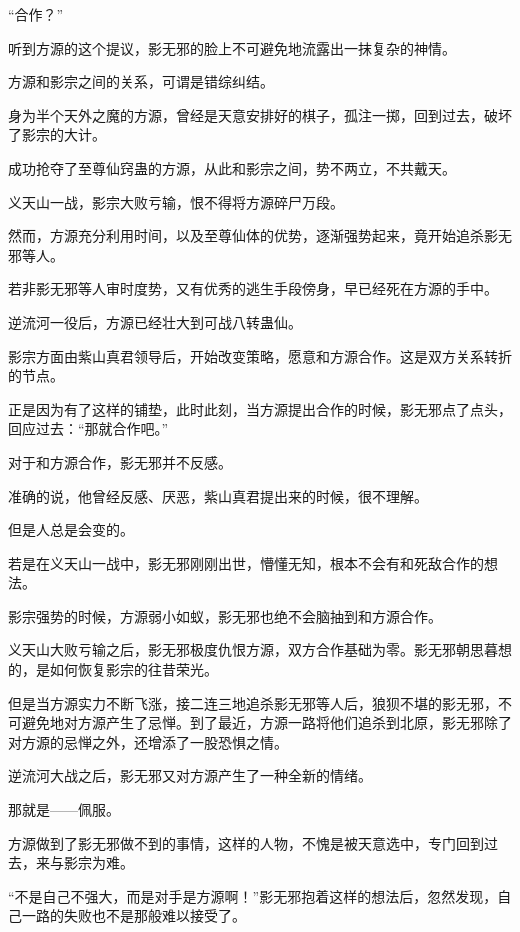 
\begin{this_body}



“合作？”

听到方源的这个提议，影无邪的脸上不可避免地流露出一抹复杂的神情。

方源和影宗之间的关系，可谓是错综纠结。

身为半个天外之魔的方源，曾经是天意安排好的棋子，孤注一掷，回到过去，破坏了影宗的大计。

成功抢夺了至尊仙窍蛊的方源，从此和影宗之间，势不两立，不共戴天。

义天山一战，影宗大败亏输，恨不得将方源碎尸万段。

然而，方源充分利用时间，以及至尊仙体的优势，逐渐强势起来，竟开始追杀影无邪等人。

若非影无邪等人审时度势，又有优秀的逃生手段傍身，早已经死在方源的手中。

逆流河一役后，方源已经壮大到可战八转蛊仙。

影宗方面由紫山真君领导后，开始改变策略，愿意和方源合作。这是双方关系转折的节点。

正是因为有了这样的铺垫，此时此刻，当方源提出合作的时候，影无邪点了点头，回应过去：“那就合作吧。”

对于和方源合作，影无邪并不反感。

准确的说，他曾经反感、厌恶，紫山真君提出来的时候，很不理解。

但是人总是会变的。

若是在义天山一战中，影无邪刚刚出世，懵懂无知，根本不会有和死敌合作的想法。

影宗强势的时候，方源弱小如蚁，影无邪也绝不会脑抽到和方源合作。

义天山大败亏输之后，影无邪极度仇恨方源，双方合作基础为零。影无邪朝思暮想的，是如何恢复影宗的往昔荣光。

但是当方源实力不断飞涨，接二连三地追杀影无邪等人后，狼狈不堪的影无邪，不可避免地对方源产生了忌惮。到了最近，方源一路将他们追杀到北原，影无邪除了对方源的忌惮之外，还增添了一股恐惧之情。

逆流河大战之后，影无邪又对方源产生了一种全新的情绪。

那就是——佩服。

方源做到了影无邪做不到的事情，这样的人物，不愧是被天意选中，专门回到过去，来与影宗为难。

“不是自己不强大，而是对手是方源啊！”影无邪抱着这样的想法后，忽然发现，自己一路的失败也不是那般难以接受了。


\end{this_body}
